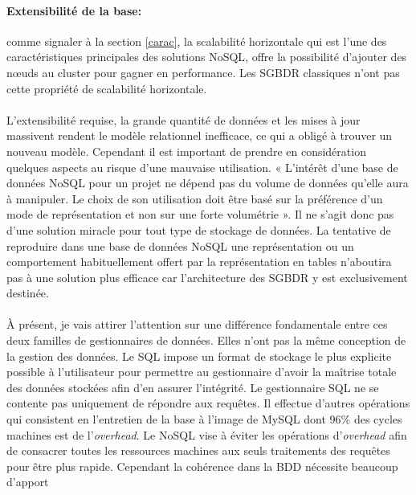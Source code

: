 \paragraph{Extensibilité de la base:} comme signaler à la section \ref{carac}, 
la scalabilité horizontale qui est l'une des caractéristiques principales 
des solutions \textsf{NoSQL}, offre la possibilité 
d'ajouter des nœuds au cluster pour gagner en performance. Les \textsf{SGBDR} classiques 
n'ont pas cette propriété de scalabilité horizontale.
\\ 
\\ 
L'extensibilité requise, la grande quantité de données
et les mises à jour massivent rendent le modèle relationnel inefficace, ce qui a
obligé à trouver un nouveau modèle. Cependant il est important de prendre en
considération quelques aspects au risque d'une mauvaise utilisation. «
L'intérêt d'une base de données \textsf{NoSQL} pour un projet ne
dépend pas du volume de données qu'elle aura à manipuler. Le choix de
son utilisation doit être basé sur la préférence d’un mode de
représentation et non sur une forte volumétrie
»\cite{NoSQLeurope}. Il ne s’agit donc pas d’une solution
miracle pour tout type de stockage de données.  La tentative de
reproduire dans une base de données \textsf{NoSQL} une représentation
ou un comportement habituellement offert par la représentation en tables
n'aboutira pas à une solution plus efficace car l'architecture des 
\textsf{SGBDR} y est exclusivement destinée.
\\
\\
À présent, je vais attirer l'attention sur une différence fondamentale
entre ces deux familles de gestionnaires de données. Elles n'ont pas
la même conception de la gestion des données. Le \textsf{SQL} impose
un format de stockage le plus explicite possible à l'utilisateur pour
permettre au gestionnaire d'avoir la maîtrise totale des données
stockées afin d'en assurer l'intégrité. Le gestionnaire \textsf{SQL}
ne se contente pas uniquement de répondre aux requêtes. Il effectue
d'autres opérations qui consistent en l'entretien de la base à l'image
de \textsf{MySQL} dont 96\% des cycles machines est de
l'\textit{overhead}. Le \textsf{NoSQL} vise à éviter les opérations
d'\textit{overhead} afin de consacrer toutes les ressources machines
aux seuls traitements des requêtes pour être plus rapide. Cependant
la cohérence dans la \textsf{BDD} nécessite beaucoup d'apport
